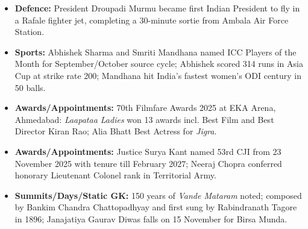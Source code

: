 \documentclass[10pt,a4paper]{article}
\begin{document}
\begin{itemize}
    \item \textbf{Defence:} President Droupadi Murmu became first Indian President to fly in a Rafale fighter jet, completing a 30-minute sortie from Ambala Air Force Station.
    \item \textbf{Sports:} Abhishek Sharma and Smriti Mandhana named ICC Players of the Month for September/October source cycle; Abhishek scored 314 runs in Asia Cup at strike rate 200; Mandhana hit India's fastest women's ODI century in 50 balls.
    \item \textbf{Awards/Appointments:} 70th Filmfare Awards 2025 at EKA Arena, Ahmedabad: \textit{Laapataa Ladies} won 13 awards incl. Best Film and Best Director Kiran Rao; Alia Bhatt Best Actress for \textit{Jigra}.
    \item \textbf{Awards/Appointments:} Justice Surya Kant named 53rd CJI from 23 November 2025 with tenure till February 2027; Neeraj Chopra conferred honorary Lieutenant Colonel rank in Territorial Army.
    \item \textbf{Summits/Days/Static GK:} 150 years of \textit{Vande Mataram} noted; composed by Bankim Chandra Chattopadhyay and first sung by Rabindranath Tagore in 1896; Janajatiya Gaurav Diwas falls on 15 November for Birsa Munda.
\end{itemize}
\end{document}

